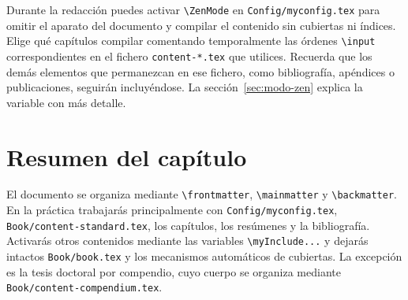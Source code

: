 Durante la redacción puedes activar \texttt{\textbackslash{}ZenMode} en \texttt{Config/myconfig.tex} para omitir el aparato del documento y compilar el contenido sin cubiertas ni índices. Elige qué capítulos compilar comentando temporalmente las órdenes \texttt{\textbackslash{}input} correspondientes en el fichero \texttt{content-*.tex} que utilices. Recuerda que los demás elementos que permanezcan en ese fichero, como bibliografía, apéndices o publicaciones, seguirán incluyéndose. La sección~\ref{sec:modo-zen} explica la variable con más detalle.


\section{Resumen del capítulo}
\label{sec:resumen-estructura-documento}

El documento se organiza mediante \texttt{\textbackslash{}frontmatter}, \texttt{\textbackslash{}mainmatter} y \texttt{\textbackslash{}backmatter}. En la práctica trabajarás principalmente con \texttt{Config/myconfig.tex}, \texttt{Book/content-standard.tex}, los capítulos, los resúmenes y la bibliografía. Activarás otros contenidos mediante las variables \texttt{\textbackslash{}myInclude...} y dejarás intactos \texttt{Book/book.tex} y los mecanismos automáticos de cubiertas. La excepción es la tesis doctoral por compendio, cuyo cuerpo se organiza mediante \texttt{Book/content-compendium.tex}.

